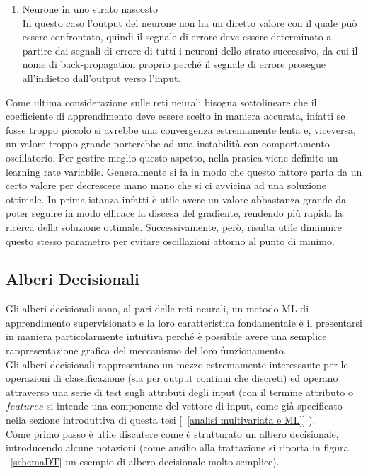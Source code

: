 \begin{enumerate}
	\item Neurone in uno strato nascosto \\
	In questo caso l'output del neurone non ha un diretto valore con il quale può essere confrontato, quindi il segnale di errore deve essere determinato a partire dai segnali di errore di tutti i neuroni dello strato successivo, da cui il nome di back-propagation proprio perché il segnale di errore prosegue all'indietro dall'output verso l'input.
\end{enumerate}
Come ultima considerazione sulle reti neurali bisogna sottolineare che il coefficiente di apprendimento deve essere scelto in maniera accurata, infatti se fosse troppo piccolo si avrebbe una convergenza estremamente lenta e, viceversa, un valore troppo grande porterebbe ad una instabilità con comportamento oscillatorio. Per gestire meglio questo aspetto, nella pratica viene definito un learning rate variabile. Generalmente si fa in modo che questo fattore parta da un certo valore per decrescere mano mano che si ci avvicina ad una soluzione ottimale. In prima istanza infatti è utile avere un valore abbastanza grande da poter seguire in modo efficace la discesa del gradiente, rendendo più rapida la ricerca della soluzione ottimale. Successivamente, però, risulta utile diminuire questo stesso parametro per evitare oscillazioni attorno al punto di minimo.

\newpage

\subsection{Alberi Decisionali}
\label{alberi decisionali}
Gli alberi decisionali sono, al pari delle reti neurali, un metodo ML di apprendimento supervisionato e  la loro caratteristica fondamentale è il presentarsi in maniera particolarmente intuitiva perché è possibile avere una semplice rappresentazione grafica del meccanismo del loro funzionamento.\\
Gli alberi decisionali rappresentano un mezzo estremamente interessante per le operazioni di classificazione (sia per output continui che discreti) ed operano attraverso una serie di test sugli attributi degli input (con il termine attributo o $\textit{features}$ si intende una componente del vettore di input, come già specificato nella sezione introduttiva di questa tesi [~\ref{analisi multivariata e ML}] ). \\ 
Come primo passo è utile discutere come è strutturato un albero decisionale, introducendo alcune notazioni (come ausilio alla trattazione si riporta in figura ~\ref{schemaDT} un esempio di albero decisionale molto semplice). \\

